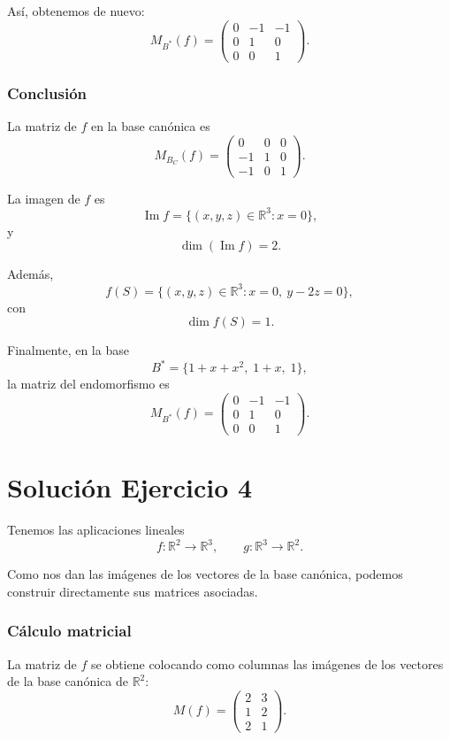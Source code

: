 \documentclass[12pt]{article}
\begin{document}
Así, obtenemos de nuevo:
\[
\boxed{
M_{B^*}(f)=
\begin{pmatrix}
0&-1&-1\\
0&1&0\\
0&0&1
\end{pmatrix}.
}
\]

\subsubsection*{Conclusión}

La matriz de \(f\) en la base canónica es
\[
M_{B_C}(f)=
\begin{pmatrix}
0&0&0\\
-1&1&0\\
-1&0&1
\end{pmatrix}.
\]

La imagen de \(f\) es
\[
\operatorname{Im} f=\{(x,y,z)\in\mathbb{R}^3:x=0\},
\]
y
\[
\dim(\operatorname{Im} f)=2.
\]

Además,
\[
f(S)=\{(x,y,z)\in\mathbb{R}^3:x=0,\ y-2z=0\},
\]
con
\[
\dim f(S)=1.
\]

Finalmente, en la base
\[
B^*=\{1+x+x^2,\;1+x,\;1\},
\]
la matriz del endomorfismo es
\[
M_{B^*}(f)=
\begin{pmatrix}
0&-1&-1\\
0&1&0\\
0&0&1
\end{pmatrix}.
\]

\section*{Solución Ejercicio 4}

Tenemos las aplicaciones lineales
\[
f:\mathbb{R}^2\longrightarrow \mathbb{R}^3,
\qquad
g:\mathbb{R}^3\longrightarrow \mathbb{R}^2.
\]

Como nos dan las imágenes de los vectores de la base canónica, podemos construir directamente sus matrices asociadas.

\subsubsection*{Cálculo matricial}

La matriz de \(f\) se obtiene colocando como columnas las imágenes de los vectores de la base canónica de \(\mathbb{R}^2\):
\[
M(f)=
\begin{pmatrix}
2&3\\
1&2\\
2&1
\end{pmatrix}.
\]
\end{document}
